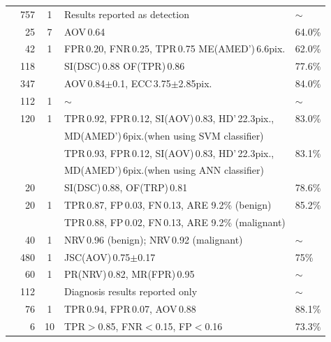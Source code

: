\documentclass[authoryear,preprint,review,12pt]{elsarticle}
\begin{document}
\begin{table}
\begin{tiny}
\begin{tabular}{rrcll}
\hline
\cite{Drukker:2002p10442}&757&1&Results reported as detection&$\sim$\\
\rowcolor[gray]{.9} \cite{massich2010lesion}&25&7&AOV\,0.64&64.0\%\\
\cite{Madabhushi:2003p6036}&42&1&FPR\,0.20, FNR\,0.25, TPR\,0.75 ME(AMED')\,6.6pix. &62.0\%\\
\rowcolor[gray]{.9} \cite{Huang:2007p6100}&118&&SI(DSC)\,0.88 OF(TPR)\,0.86&77.6\%\\
\cite{Zhang:2010p14317}&347&&AOV\,0.84$\pm$0.1, ECC\,3.75$\pm$2.85pix.&84.0\%\\
\rowcolor[gray]{.9} \cite{Jiang:2012p14354}&112&1&$\sim$&$\sim$\\
\cite{Shan:2012p14347}&120&1&TPR\,0.92, FPR\,0.12, SI(AOV)\,0.83, HD'\,22.3pix., &83.0\%\\ &&&MD(AMED')\,6pix.\quad(when using SVM classifier)&\\&&&TPR\,0.93, FPR\,0.12, SI(AOV)\,0.83, HD'\,22.3pix., &83.1\%\\ &&&MD(AMED')\,6pix.\quad(when using ANN classifier)&\\

\hline

\rowcolor[gray]{.9} \cite{Huang:2005p11636}&20&&SI(DSC)\,0.88, OF(TRP)\,0.81 &78.6\%\\
\cite{Huang:2012p14313}&20&1&TPR\,0.87,  FP\,0.03,  FN\,0.13, ARE 9.2\% (benign)&85.2\%\\
													&&&TPR\,0.88,  FP\,0.02,  FN\,0.13, ARE 9.2\% (malignant)&\\
\rowcolor[gray]{.9} \cite{Liu:2005p14341}&40&1&NRV\,0.96 (benign); NRV\,0.92 (malignant)&$\sim$\\
\cite{hao2012combining}&480&1&JSC(AOV)\,0.75$\pm$0.17&75\%\\
\rowcolor[gray]{.9} \cite{Huang:2004p2092}&60&1&PR(NRV)\,0.82, MR(FPR)\,0.95&$\sim$\\
\cite{Liu:2010p12036}&112&&Diagnosis results reported only&$\sim$\\
\rowcolor[gray]{.9} \cite{Liu:2010p14328}&76&1&TPR\,0.94, FPR\,0.07, AOV\,0.88&88.1\%\\
\cite{Yeh:2009p11985}&6&10&TPR$>$0.85, FNR$<$0.15, FP$<$0.16&73.3\%\\

\bottomrule
\end{tabular}
\end{tiny}
\end{table}
\end{document}
